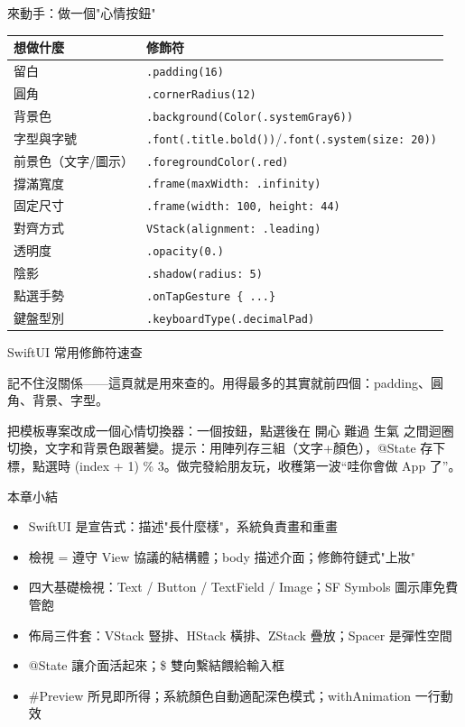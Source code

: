 \begin{tcbpractice}{來動手：做一個"心情按鈕"}

\begin{center}
\begin{tabularx}{\linewidth}{|X|X|}
\hline
\textbf{想做什麼} & \textbf{修飾符} \tabularnewline
\hline
留白 & \texttt{.\allowbreak padding(16)} \tabularnewline
圓角 & \texttt{.\allowbreak cornerRadius(12)} \tabularnewline
背景色 & \texttt{.\allowbreak background(Color(.\allowbreak systemGray6))} \tabularnewline
字型與字號 & \texttt{.\allowbreak font(.\allowbreak title.\allowbreak bold())}/\texttt{.\allowbreak font(.\allowbreak system(size: 20))} \tabularnewline
前景色（文字/圖示） & \texttt{.\allowbreak foregroundColor(.\allowbreak red)} \tabularnewline
撐滿寬度 & \texttt{.\allowbreak frame(maxWidth: .\allowbreak infinity)} \tabularnewline
固定尺寸 & \texttt{.\allowbreak frame(width: 100, height: 44)} \tabularnewline
對齊方式 & \texttt{VStack(alignment: .\allowbreak leading)} \tabularnewline
透明度 & \texttt{.\allowbreak opacity(0.\allowbreak 6)} \tabularnewline
陰影 & \texttt{.\allowbreak shadow(radius: 5)} \tabularnewline
點選手勢 & \texttt{.\allowbreak onTapGesture \{ .\allowbreak .\allowbreak .\allowbreak  \}} \tabularnewline
鍵盤型別 & \texttt{.\allowbreak keyboardType(.\allowbreak decimalPad)} \tabularnewline
\hline
\end{tabularx}
\end{center}

\begin{center}\small\color{gray}SwiftUI 常用修飾符速查\end{center}

記不住沒關係——這頁就是用來查的。用得最多的其實就前四個：padding、圓角、背景、字型。

把模板專案改成一個心情切換器：一個按鈕，點選後在 開心 難過 生氣 之間迴圈切換，文字和背景色跟著變。提示：用陣列存三組（文字+顏色），@State 存下標，點選時 (index + 1) \% 3。做完發給朋友玩，收穫第一波“哇你會做 App 了”。

\end{tcbpractice}

\begin{tcbsummary}{本章小結}
\begin{itemize}
  \item SwiftUI 是宣告式：描述"長什麼樣"，系統負責畫和重畫
  \item 檢視 = 遵守 View 協議的結構體；body 描述介面；修飾符鏈式"上妝"
  \item 四大基礎檢視：Text / Button / TextField / Image；SF Symbols 圖示庫免費管飽
  \item 佈局三件套：VStack 豎排、HStack 橫排、ZStack 疊放；Spacer 是彈性空間
  \item @State 讓介面活起來；\$ 雙向繫結餵給輸入框
  \item \#Preview 所見即所得；系統顏色自動適配深色模式；withAnimation 一行動效
\end{itemize}

\end{tcbsummary}
